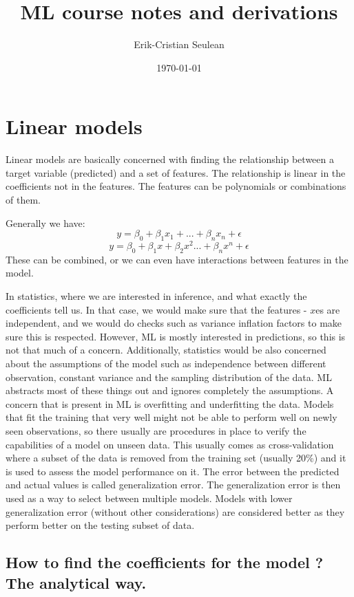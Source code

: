 \documentclass[12pt,a4paper]{article}
\author{Erik-Cristian Seulean}
\title{ML course notes and derivations}
\date{\today}
\begin{document}
\newpage
\maketitle

\section{Linear models}

Linear models are basically concerned with finding the relationship between a target variable (predicted) and a set of features. The relationship is linear in the coefficients not in the features. The features can be polynomials or combinations of them. 

Generally we have: $$y = \beta_{0} + \beta_{1}x_{1} + ... + \beta_{n}x_{n} + \epsilon$$ 
$$y = \beta_{0} + \beta_{1}x + \beta_{2}x^{2} ... + \beta_{n}x^{n} + \epsilon $$
These can be combined, or we can even have interactions between features in the model.

In statistics, where we are interested in inference, and what exactly the coefficients tell us. In that case, we would make sure that the features - $x$es are independent, and we would do checks such as variance inflation factors to make sure this is respected. However, ML is mostly interested in predictions, so this is not that much of a concern. Additionally, statistics would be also concerned about the assumptions of the model such as independence between different observation, constant variance and the sampling distribution of the data. ML abstracts most of these things out and ignores completely the assumptions.
A concern that is present in ML is overfitting and underfitting the data. Models that fit the training that very well might not be able to perform well on newly seen observations, so there usually are procedures in place to verify the capabilities of a model on unseen data. This usually comes as cross-validation where a subset of the data is removed from the training set (usually 20\%) and it is used to assess the model performance on it. The error between the predicted and actual values is called generalization error. The generalization error is then used as a way to select between multiple models. Models with lower generalization error (without other considerations) are considered better as they perform better on the testing subset of data.

\subsection{How to find the coefficients for the model ? The analytical way.}
\end{document}
